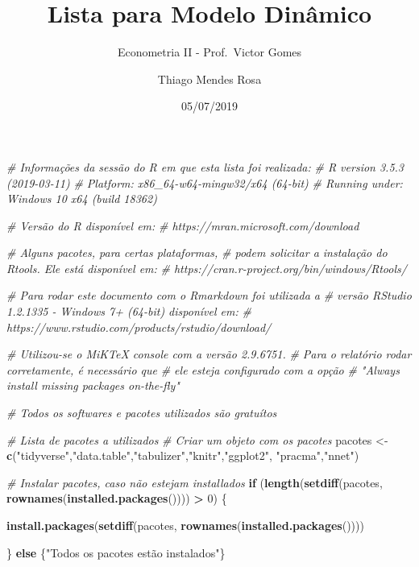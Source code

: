 \documentclass[12pt,a4paper]{article}
\title{Lista para Modelo Dinâmico}
\subtitle{Econometria II - Prof.~Victor Gomes}
\author{Thiago Mendes Rosa}
\date{05/07/2019}
\newenvironment{Shaded}{\begin{snugshade}}{\end{snugshade}}
\newcommand{\CommentTok}[1]{\textcolor[rgb]{0.56,0.35,0.01}{\textit{#1}}}
\newcommand{\ControlFlowTok}[1]{\textcolor[rgb]{0.13,0.29,0.53}{\textbf{#1}}}
\newcommand{\DecValTok}[1]{\textcolor[rgb]{0.00,0.00,0.81}{#1}}
\newcommand{\KeywordTok}[1]{\textcolor[rgb]{0.13,0.29,0.53}{\textbf{#1}}}
\newcommand{\NormalTok}[1]{#1}
\newcommand{\OperatorTok}[1]{\textcolor[rgb]{0.81,0.36,0.00}{\textbf{#1}}}
\newcommand{\StringTok}[1]{\textcolor[rgb]{0.31,0.60,0.02}{#1}}
\begin{document}
\maketitle

\begin{Shaded}
\begin{Highlighting}[]
\CommentTok{# Informações da sessão do R em que esta lista foi realizada:}
\CommentTok{# R version 3.5.3 (2019-03-11)}
\CommentTok{# Platform: x86_64-w64-mingw32/x64 (64-bit)}
\CommentTok{# Running under: Windows 10 x64 (build 18362)}

\CommentTok{# Versão do R disponível em:}
\CommentTok{# https://mran.microsoft.com/download}

\CommentTok{# Alguns pacotes, para certas plataformas,}
\CommentTok{# podem solicitar a instalação do Rtools. Ele está disponível em:}
\CommentTok{# https://cran.r-project.org/bin/windows/Rtools/}

\CommentTok{# Para rodar este documento com o Rmarkdown foi utilizada a}
\CommentTok{# versão RStudio 1.2.1335 - Windows 7+ (64-bit) disponível em:}
\CommentTok{# https://www.rstudio.com/products/rstudio/download/}

\CommentTok{# Utilizou-se o MiKTeX console com a versão 2.9.6751.}
\CommentTok{# Para o relatório rodar corretamente, é necessário que}
\CommentTok{# ele esteja configurado com a opção}
\CommentTok{# "Always install missing packages on-the-fly"}

\CommentTok{# Todos os softwares e pacotes utilizados são gratuítos}

\CommentTok{# Lista de pacotes a utilizados}
\CommentTok{# Criar um objeto com os pacotes}
\NormalTok{pacotes <-}\StringTok{ }\KeywordTok{c}\NormalTok{(}\StringTok{"tidyverse"}\NormalTok{,}\StringTok{"data.table"}\NormalTok{,}\StringTok{"tabulizer"}\NormalTok{,}\StringTok{"knitr"}\NormalTok{,}\StringTok{"ggplot2"}\NormalTok{,}
             \StringTok{"pracma"}\NormalTok{,}\StringTok{"nnet"}\NormalTok{)}

\CommentTok{# Instalar pacotes, caso não estejam installados}
\ControlFlowTok{if}\NormalTok{ (}\KeywordTok{length}\NormalTok{(}\KeywordTok{setdiff}\NormalTok{(pacotes, }\KeywordTok{rownames}\NormalTok{(}\KeywordTok{installed.packages}\NormalTok{()))) }\OperatorTok{>}\StringTok{ }\DecValTok{0}\NormalTok{) \{}
  
  \KeywordTok{install.packages}\NormalTok{(}\KeywordTok{setdiff}\NormalTok{(pacotes, }\KeywordTok{rownames}\NormalTok{(}\KeywordTok{installed.packages}\NormalTok{())))}

\NormalTok{\} }\ControlFlowTok{else}\NormalTok{ \{}\StringTok{"Todos os pacotes estão instalados"}\NormalTok{\}}
\end{Highlighting}
\end{Shaded}
\end{document}
